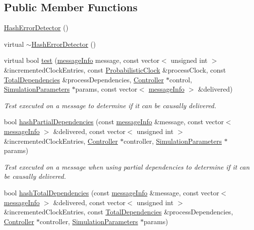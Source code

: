 \subsection*{Public Member Functions}
\begin{DoxyCompactItemize}
\item 
\hyperlink{class_hash_error_detector_a008bd7bd3f8d202334afd51a71cbbdae}{Hash\+Error\+Detector} ()
\item 
virtual \hyperlink{class_hash_error_detector_a187ba4d9f902ecaa0ff8b92ec531d3f4}{$\sim$\+Hash\+Error\+Detector} ()
\item 
virtual bool \hyperlink{class_hash_error_detector_a1c7fe649a34cf7e139ce53a248dce748}{test} (\hyperlink{structures_8h_a7e7bdc1d2fff8a9436f2f352b2711ed6}{message\+Info} message, const vector$<$ unsigned int $>$ \&incremented\+Clock\+Entries, const \hyperlink{class_probabilistic_clock}{Probabilistic\+Clock} \&process\+Clock, const \hyperlink{class_total_dependencies}{Total\+Dependencies} \&process\+Dependencies, \hyperlink{class_controller}{Controller} $\ast$control, \hyperlink{class_simulation_parameters}{Simulation\+Parameters} $\ast$params, const vector$<$ \hyperlink{structures_8h_a7e7bdc1d2fff8a9436f2f352b2711ed6}{message\+Info} $>$ \&delivered)
\begin{DoxyCompactList}\small\item\em Test executed on a message to determine if it can be causally delivered. \end{DoxyCompactList}\item 
bool \hyperlink{class_hash_error_detector_a851c562e49f608ec3fe3e984db27bfca}{hash\+Partial\+Dependencies} (const \hyperlink{structures_8h_a7e7bdc1d2fff8a9436f2f352b2711ed6}{message\+Info} \&message, const vector$<$ \hyperlink{structures_8h_a7e7bdc1d2fff8a9436f2f352b2711ed6}{message\+Info} $>$ \&delivered, const vector$<$ unsigned int $>$ \&incremented\+Clock\+Entries, \hyperlink{class_controller}{Controller} $\ast$controller, \hyperlink{class_simulation_parameters}{Simulation\+Parameters} $\ast$params)
\begin{DoxyCompactList}\small\item\em Test executed on a message when using partial dependencies to determine if it can be causally delivered. \end{DoxyCompactList}\item 
bool \hyperlink{class_hash_error_detector_a13dd5fae3ca4898bd91d1801beed24a4}{hash\+Total\+Dependencies} (const \hyperlink{structures_8h_a7e7bdc1d2fff8a9436f2f352b2711ed6}{message\+Info} \&message, const vector$<$ \hyperlink{structures_8h_a7e7bdc1d2fff8a9436f2f352b2711ed6}{message\+Info} $>$ \&delivered, const vector$<$ unsigned int $>$ \&incremented\+Clock\+Entries, const \hyperlink{class_total_dependencies}{Total\+Dependencies} \&process\+Dependencies, \hyperlink{class_controller}{Controller} $\ast$controller, \hyperlink{class_simulation_parameters}{Simulation\+Parameters} $\ast$params)

\end{DoxyCompactItemize}
